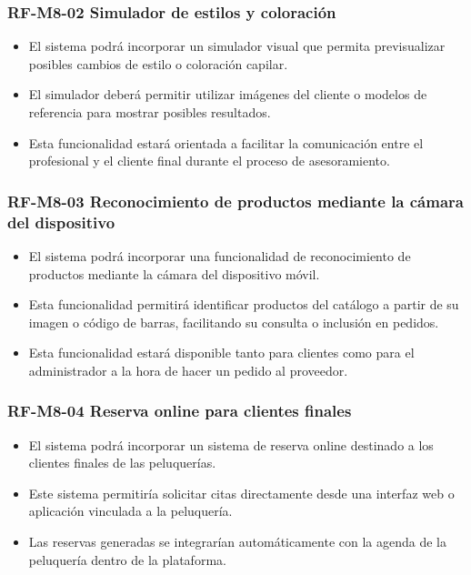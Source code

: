 \vspace{-0.75em}
\subsubsection{RF-M8-02 Simulador de estilos y coloración}
\vspace{-1em}

\begin{itemize}
    \item El sistema podrá incorporar un simulador visual que permita previsualizar posibles cambios de estilo o coloración capilar.
    \item El simulador deberá permitir utilizar imágenes del cliente o modelos de referencia para mostrar posibles resultados.
    \item Esta funcionalidad estará orientada a facilitar la comunicación entre el profesional y el cliente final durante el proceso de asesoramiento.
\end{itemize}

\vspace{-0.75em}
\subsubsection{RF-M8-03 Reconocimiento de productos mediante la cámara del dispositivo}
\vspace{-1em}

\begin{itemize}
    \item El sistema podrá incorporar una funcionalidad de reconocimiento de productos mediante la cámara del dispositivo móvil.
    \item Esta funcionalidad permitirá identificar productos del catálogo a partir de su imagen o código de barras, facilitando su consulta o inclusión en pedidos.
    \item Esta funcionalidad estará disponible tanto para clientes como para el administrador a la hora de hacer un pedido al proveedor.
\end{itemize}


\vspace{-0.75em}
\subsubsection{RF-M8-04 Reserva online para clientes finales}
\vspace{-1em}

\begin{itemize}
    \item El sistema podrá incorporar un sistema de reserva online destinado a los clientes finales de las peluquerías.
    \item Este sistema permitiría solicitar citas directamente desde una interfaz web o aplicación vinculada a la peluquería.
    \item Las reservas generadas se integrarían automáticamente con la agenda de la peluquería dentro de la plataforma.
\end{itemize}